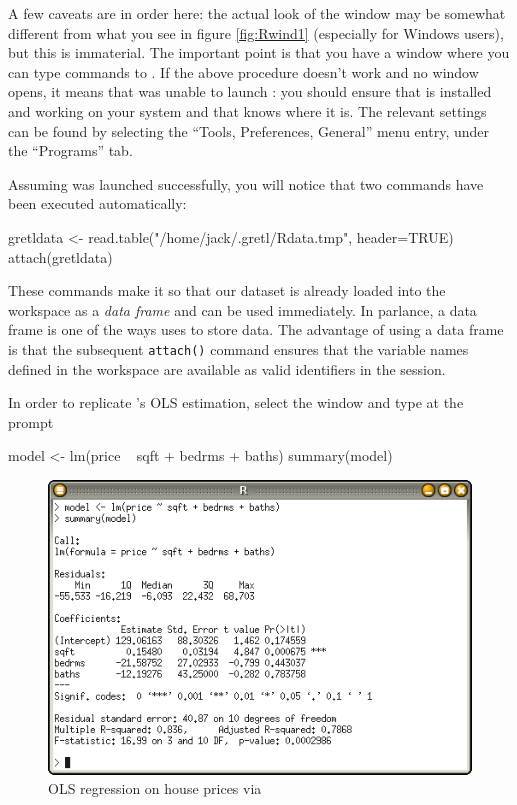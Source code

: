 A few caveats are in order here: the actual look of the  window
may be somewhat different from what you see in figure \ref{fig:Rwind1}
(especially for Windows users), but this is immaterial. The important
point is that you have a window where you can type commands to
. If the above procedure doesn't work and no  window
opens, it means that  was unable to launch : you
should ensure that  is installed and working on your system and
that  knows where it is. The relevant settings can be found
by selecting the ``Tools, Preferences, General'' menu entry, under the
``Programs'' tab.

Assuming  was launched successfully, you will notice that two
commands have been executed automatically:
\begin{code}
  gretldata <- read.table("/home/jack/.gretl/Rdata.tmp", header=TRUE)
  attach(gretldata)
\end{code}
These commands make it so that our dataset is already loaded into the
 workspace as a \emph{data frame} and can be used
immediately. In  parlance, a data frame is one of the ways
 uses to store data. The advantage of using a data frame is
that the subsequent \texttt{attach()} command ensures that the
variable names defined in the  workspace are available as
valid identifiers in the  session.

In order to replicate 's OLS estimation, select the 
window and type at the prompt
\begin{code}
  model <- lm(price ~ sqft + bedrms + baths)
  summary(model)
\end{code}

\begin{figure}[htbp]
  \centering
  \includegraphics[scale=0.7]{figures/Rwindow-2}
  \caption{OLS regression on house prices via }
  \label{fig:Rwind2}
\end{figure}

